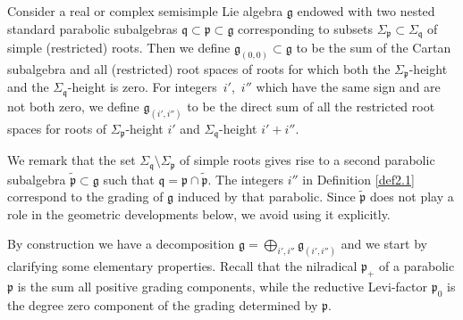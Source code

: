 \documentclass[pdftex]{sigma}
\numberwithin{equation}{section}
\def\frak{\mathfrak}
\newcommand{\Si}{\Sigma}
\begin{document}
\begin{Definition}\label{def2.1}
 Consider a real or complex semisimple Lie algebra $\frak g$ endowed with two nested
 standard parabolic subalgebras $\frak q\subset\frak p\subset\frak g$ corresponding
 to subsets $\Si_{\frak p}\subset\Si_{\frak q}$ of simple (restricted) roots. Then
 we define $\frak g_{(0,0)}\subset\frak g$ to be the sum of the Cartan subalgebra
 and all (restricted) root spaces of roots for which both the $\Si_{\frak p}$-height
 and the $\Si_{\frak q}$-height is zero. For integers~$i'$,~$i''$ which have the same
 sign and are not both zero, we define $\frak g_{(i',i'')}$ to be the direct sum of
 all the restricted root spaces for roots of $\Si_{\frak p}$-height $i'$ and
 $\Si_{\frak q}$-height $i'+i''$.
\end{Definition}

We remark that the set $\Si_{\frak q}\setminus\Si_{\frak p}$ of simple roots gives
rise to a second parabolic subalgebra $\tilde{\frak p}\subset\frak g$ such that
$\frak q=\frak p\cap\tilde{\frak p}$. The integers $i''$ in Definition \ref{def2.1}
correspond to the grading of $\frak g$ induced by that parabolic. Since $\tilde{\frak
 p}$ does not play a role in the geometric developments below, we avoid using it
explicitly.

By construction we have a decomposition $\frak g=\bigoplus_{i',i''}\frak g_{(i',i'')}$
and we start by clarifying some elementary properties. Recall that the nilradical
$\frak p_+$ of a parabolic $\frak p$ is the sum all positive grading components,
while the reductive Levi-factor $\frak p_0$ is the degree zero component of the
grading determined by $\frak p$.
\end{document}
